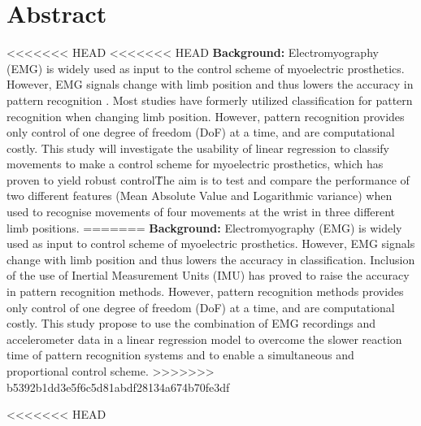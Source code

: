 \section{Abstract}

<<<<<<< HEAD
<<<<<<< HEAD
\textbf{Background:} Electromyography (EMG) is widely used as input to the control scheme of myoelectric prosthetics. However, EMG signals change with limb position and thus lowers the accuracy in pattern recognition \cite{Fougner2010}.%
Most studies have formerly utilized classification for pattern recognition when changing limb position.  
However, pattern recognition provides only control of one degree of freedom (DoF) at a time, and are computational costly. This study will investigate the usability of linear regression to classify movements to make a control scheme for myoelectric prosthetics, which has proven to yield robust control\cite{hahne2014}\. The aim is to test and compare the performance of two different features (Mean Absolute Value and Logarithmic variance) when used to recognise movements of four movements at the wrist in three different limb positions. 
=======
\textbf{Background:} Electromyography (EMG) is widely used as input to control scheme of myoelectric prosthetics. However, EMG signals change with limb position and thus lowers the accuracy in classification.%
Inclusion of the use of Inertial Measurement Units (IMU) has proved to raise the accuracy in pattern recognition methods. However, pattern recognition methods provides only control of one degree of freedom (DoF) at a time, and are computational costly. This study propose to use the combination of EMG recordings and accelerometer data in a linear regression model to overcome the slower reaction time of pattern recognition systems and to enable a simultaneous and proportional control scheme. 
>>>>>>> b5392b1dd3e5f6c5d81abdf28134a674b70fe3df


<<<<<<< HEAD


